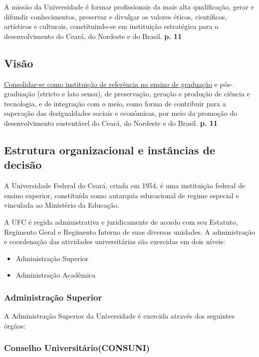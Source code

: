 \documentclass{report}
\begin{document}
A missão da Universidade é formar profissionais da mais alta qualificação, gerar e difundir conhecimentos, preservar e divulgar os valores éticos, científicos, artísticos e culturais, constituindo-se em instituição estratégica para o desenvolvimento do Ceará, do Nordeste e do Brasil.
\textbf{p. 11}

\subsection{Visão}

\underline{Consolidar-se como instituição de referência no ensino de graduação} e pós-graduação (stricto e lato sensu), de preservação, geração e produção de ciência e tecnologia, e de integração com o meio, como forma de contribuir para a superação das desigualdades sociais e econômicas, por meio da promoção do desenvolvimento sustentável do Ceará, do Nordeste e do Brasil.
\textbf{p. 11}

\subsection{Estrutura organizacional e instâncias de decisão}

A Universidade Federal do Ceará, criada em 1954, é uma instituição federal de ensino superior, constituída como autarquia educacional de regime especial e vinculada ao Ministério da Educação.

A UFC é regida administrativa e juridicamente de acordo com seu Estatuto, Regimento Geral e Regimento Interno de suas diversas unidades. A administração e coordenação das atividades universitárias são exercidas em dois níveis: 

\begin{itemize}
\item Administração Superior
\item Administração Acadêmica
\end{itemize}

\subsubsection{Administração Superior}

A Administração Superior da Universidade é exercida através dos seguintes órgãos:

\subsubsection{Conselho Universitário(CONSUNI)}
\end{document}
